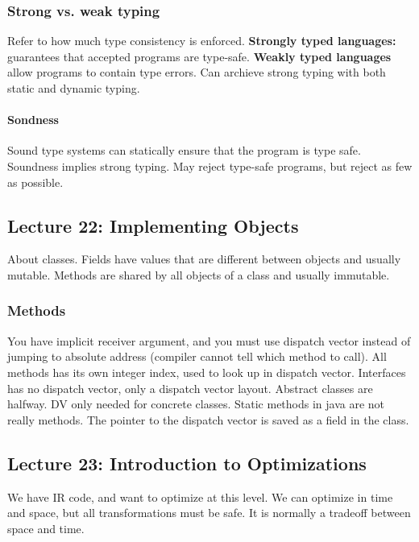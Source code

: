 \subsubsection{Strong vs. weak typing} %
\label{ssub:Strong vs. weak typing}
Refer to how much type consistency is enforced. \textbf{Strongly typed languages:} guarantees that accepted programs are type-safe. \textbf{Weakly typed languages} allow programs to contain type errors. Can archieve strong typing with both static and dynamic typing.

\paragraph{Sondness} %
\label{par:Sondness}
Sound type systems can statically ensure that the program is type safe. Soundness implies strong typing. May reject type-safe programs, but reject as few as possible.

\subsection{Lecture 22: Implementing Objects} %
\label{sub:Lecture 22: Implementing Objects}
About classes. Fields have values that are different between objects and usually mutable. Methods are shared by all objects of a class and usually immutable.

\subsubsection{Methods} %
\label{ssub:Methods}
You have implicit receiver argument, and you must use dispatch vector instead of jumping to absolute address (compiler cannot tell which method to call). All methods has its own integer index, used to look up in dispatch vector. Interfaces has no dispatch vector, only a dispatch vector layout. Abstract classes are halfway. DV only needed for concrete classes. Static methods in java are not really methods. The pointer to the dispatch vector is saved as a field in the class.


\subsection{Lecture 23: Introduction to Optimizations} %
\label{ssub:Lecture 23: Introduction to Optimizations}
We have IR code, and want to optimize at this level. We can optimize in time and space, but all transformations must be safe. It is normally a tradeoff between space and time.

